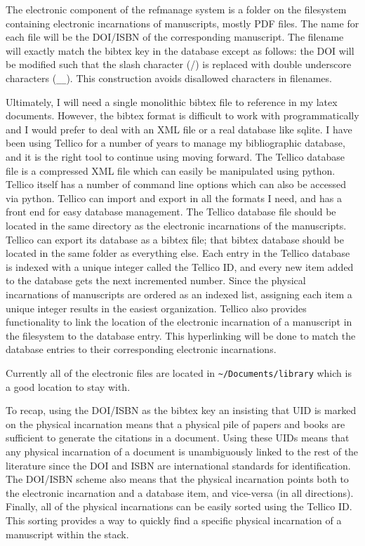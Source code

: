 \documentclass[letterpaper,12pt]{article}
\begin{document}
The electronic component of the refmanage system is a folder on the filesystem containing electronic incarnations of manuscripts, mostly PDF files. The name for each file will be the DOI/ISBN of the corresponding manuscript. The filename will exactly match the bibtex key in the database except as follows: the DOI will be modified such that the slash character (/) is replaced with double underscore characters (\verb|__|). This construction avoids disallowed characters in filenames.

Ultimately, I will need a single monolithic bibtex file to reference in my latex documents. However, the bibtex format is difficult to work with programmatically and I would prefer to deal with an XML file or a real database like sqlite. I have been using Tellico for a number of years to manage my bibliographic database, and it is the right tool to continue using moving forward. The Tellico database file is a compressed XML file which can easily be manipulated using python. Tellico itself has a number of command line options which can also be accessed via python. Tellico can import and export in all the formats I need, and has a front end for easy database management. The Tellico database file should be located in the same directory as the electronic incarnations of the manuscripts. Tellico can export its database as a bibtex file; that bibtex database should be located in the same folder as everything else. Each entry in the Tellico database is indexed with a unique integer called the Tellico ID, and every new item added to the database gets the next incremented number. Since the physical incarnations of manuscripts are ordered as an indexed list, assigning each item a unique integer results in the easiest organization. Tellico also provides functionality to link the location of the electronic incarnation of a manuscript in the filesystem to the database entry. This hyperlinking will be done to match the database entries to their corresponding electronic incarnations.

Currently all of the electronic files are located in \verb|~/Documents/library| which is a good location to stay with.

To recap, using the DOI/ISBN as the bibtex key an insisting that UID is marked on the physical incarnation means that a physical pile of papers and books are sufficient to generate the citations in a document. Using these UIDs means that any physical incarnation of a document is unambiguously linked to the rest of the literature since the DOI and ISBN are international standards for identification. The DOI/ISBN scheme also means that the physical incarnation points both to the electronic incarnation and a database item, and vice-versa (in all directions). Finally, all of the physical incarnations can be easily sorted using the Tellico ID. This sorting provides a way to quickly find a specific physical incarnation of a manuscript within the stack.
\end{document}
